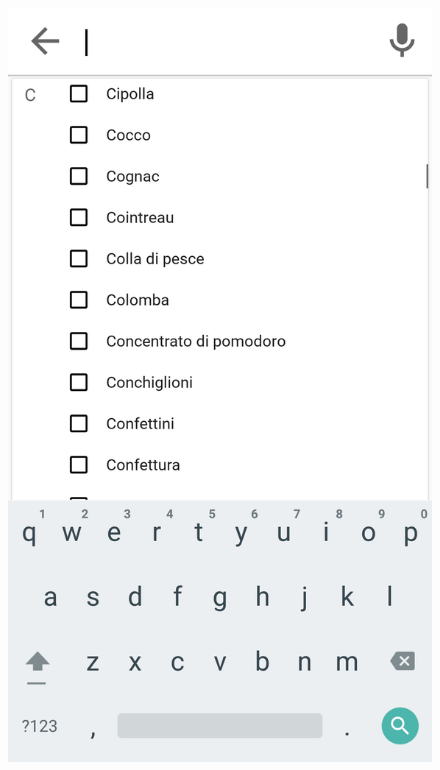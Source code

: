 \begin{figure}[H]
\begin{minipage}{.49\textwidth}
		\includegraphics[width=\textwidth]{img/wireframe/search_page_esclusione_scroll_tastiera.png}
	\end{minipage}
\end{figure}
